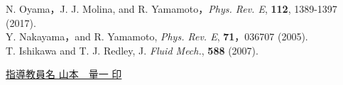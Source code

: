 \documentclass[twocolumns,10pt,a4j]{jarticle}
\begin{document}

  \renewcommand{\refname}{\normalsize 参考文献\vspace{-3truemm}}
  \begin{thebibliography}{9}
    N. Oyama，J. J. Molina, and R. Yamamoto，\textit{Phys. Rev. E}, \textbf{112}, 1389-1397 (2017).\\
  \vspace{-7truemm}
    Y. Nakayama，and R. Yamamoto, \textit{Phys. Rev. E}, \textbf{71}，036707 (2005).\\
  \vspace{-7truemm}
    T. Ishikawa and T. J. Redley, J. \textit{Fluid Mech.}, \textbf{588} (2007).
  \end{thebibliography}


  \centering
  \underline{指導教員名\hspace{10truemm} 山本　量一 \hspace{20truemm} 印}

\end{document}
